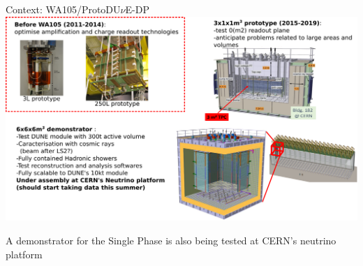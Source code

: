 \documentclass[10pt]{beamer}
\begin{document}
    \begin{frame}{Context: WA105/\texorpdfstring{ProtoDU$\nu$E}{ProtoDUNE}-DP}
		\includegraphics[width=\linewidth]{figures/contexte/wa105}\\
		\begin{scriptsize}
			A demonstrator for the Single Phase is also being tested at CERN's neutrino platform
		\end{scriptsize}
		
    \end{frame}
    
    {
    	\setlength\pdfpagewidth{12.8cm}%
    	\setlength\pdfpageheight{9cm}%
    	\begin{frame}[plain]
    		
    	\end{frame}
    }
    
\end{document}
